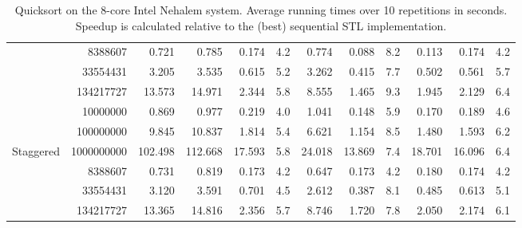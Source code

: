 \documentclass[preprint]{sigplanconf}
\begin{document}
\begin{table*}[t!]
\begin{center}
\begin{tabular}{|lr|rr|rrr|rrr||rr|}
 & 8388607 & 0.721 & 0.785 & 0.174 & 4.2 & 0.774 & 0.088 & 8.2 & 0.113 & 0.174 & 4.2 \\
 & 33554431 & 3.205 & 3.535 & 0.615 & 5.2 & 3.262 & 0.415 & 7.7 & 0.502 & 0.561 & 5.7 \\
 & 134217727 & 13.573 & 14.971 & 2.344 & 5.8 & 8.555 & 1.465 & 9.3 & 1.945 & 2.129 & 6.4 \\
\hline
 & 10000000 & 0.869 & 0.977 & 0.219 & 4.0 & 1.041 & 0.148 & 5.9 & 0.170 & 0.189 & 4.6 \\
 & 100000000 & 9.845 & 10.837 & 1.814 & 5.4 & 6.621 & 1.154 & 8.5 & 1.480 & 1.593 & 6.2 \\
Staggered & 1000000000 & 102.498 & 112.668 & 17.593 & 5.8 & 24.018 & 13.869 & 7.4 & 18.701 & 16.096 & 6.4 \\
 & 8388607 & 0.731 & 0.819 & 0.173 & 4.2 & 0.647 & 0.173 & 4.2 & 0.180 & 0.174 & 4.2 \\
 & 33554431 & 3.120 & 3.591 & 0.701 & 4.5 & 2.612 & 0.387 & 8.1 & 0.485 & 0.613 & 5.1 \\
 & 134217727 & 13.365 & 14.816 & 2.356 & 5.7 & 8.746 & 1.720 & 7.8 & 2.050 & 2.174 & 6.1 \\

\hline
\end{tabular}
\end{center}
\caption{Quicksort on the 8-core Intel Nehalem system. 
Average running times over 10 repetitions in seconds. 
Speedup is calculated relative to the (best) sequential STL implementation.}
\label{tab:sort_cora_avg}
\end{table*}
\end{document}
